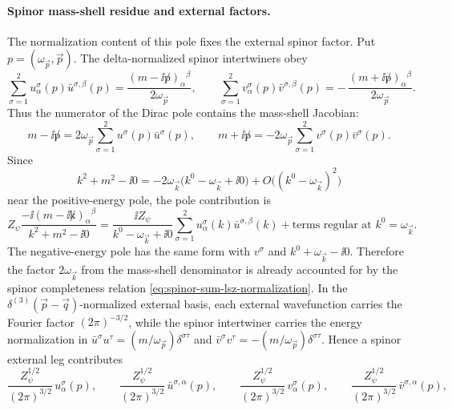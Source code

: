\paragraph{Spinor mass-shell residue and external factors.}
The normalization content of this pole fixes the external spinor factor.  Put
\(p=(\omega_{\vec p},\vec p)\).  The
delta-normalized spinor intertwiners obey
\begin{equation}
  \sum_{\sigma=1}^2
  u_\alpha^\sigma(p)\bar u^{\sigma,\beta}(p)
  =
  \frac{(m-\ii\not p)_\alpha{}^\beta}{2\omega_{\vec p}},
  \qquad
  \sum_{\sigma=1}^2
  v_\alpha^\sigma(p)\bar v^{\sigma,\beta}(p)
  =
  -\,\frac{(m+\ii\not p)_\alpha{}^\beta}{2\omega_{\vec p}} .
  \label{eq:spinor-sum-lsz-normalization}
\end{equation}
Thus the numerator of the Dirac pole contains the mass-shell Jacobian:
\begin{equation}
  m-\ii\not p
  =
  2\omega_{\vec p}
  \sum_{\sigma=1}^2 u^\sigma(p)\bar u^\sigma(p),
  \qquad
  m+\ii\not p
  =
  -2\omega_{\vec p}
  \sum_{\sigma=1}^2 v^\sigma(p)\bar v^\sigma(p).
  \label{eq:spinor-numerator-jacobian}
\end{equation}
Since
\[
  k^2+m^2-\ii0
  =
  -2\omega_{\vec k}\bigl(k^0-\omega_{\vec k}+\ii0\bigr)
  +
  O\bigl((k^0-\omega_{\vec k})^2\bigr)
\]
near the positive-energy pole, the pole contribution is
\begin{equation}
  Z_\psi
  \frac{-\ii(m-\ii\not k)_\alpha{}^\beta}
       {k^2+m^2-\ii0}
  =
  \frac{\ii Z_\psi}
       {k^0-\omega_{\vec k}+\ii0}
  \sum_{\sigma=1}^2
  u_\alpha^\sigma(k)\bar u^{\sigma,\beta}(k)
  +\text{terms regular at }k^0=\omega_{\vec k}.
  \label{eq:positive-energy-spinor-pole-residue}
\end{equation}
The negative-energy pole has the same form with \(v^\sigma\) and
\(k^0+\omega_{\vec k}-\ii0\).  Therefore the factor \(2\omega_{\vec k}\) from
the mass-shell denominator is already accounted for by the spinor completeness
relation \eqref{eq:spinor-sum-lsz-normalization}.  In the
\(\delta^{(3)}(\vec p-\vec q)\)-normalized external basis, each external
wavefunction carries the Fourier factor \((2\pi)^{-3/2}\), while the spinor
intertwiner carries the energy normalization in
\(\bar u^\sigma u^\tau=(m/\omega_{\vec p})\delta^{\sigma\tau}\) and
\(\bar v^\sigma v^\tau=-(m/\omega_{\vec p})\delta^{\sigma\tau}\).  Hence a
spinor external leg contributes
\begin{equation}
  \frac{Z_\psi^{1/2}}{(2\pi)^{3/2}}\,u^\sigma_\alpha(p),
  \qquad
  \frac{Z_\psi^{1/2}}{(2\pi)^{3/2}}\,\bar u^{\sigma,\alpha}(p),
  \qquad
  \frac{Z_\psi^{1/2}}{(2\pi)^{3/2}}\,v^\sigma_\alpha(p),
  \qquad
  \frac{Z_\psi^{1/2}}{(2\pi)^{3/2}}\,\bar v^{\sigma,\alpha}(p),
  \label{eq:spinor-external-normalization-factors}
\end{equation}
